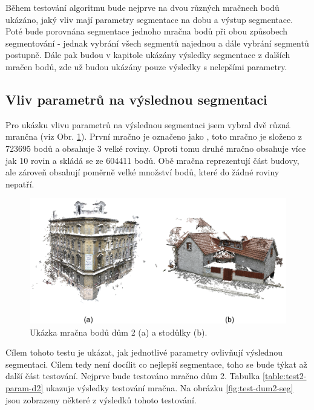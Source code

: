 \documentclass[11pt,twoside,a4paper]{book}
\begin{document}
Během testování algoritmu bude nejprve na dvou různých mračnech bodů ukázáno, jaký vliv mají parametry segmentace na dobu a výstup segmentace. Poté bude porovnána segmentace jednoho mračna bodů při obou způsobech segmentování - jednak vybrání všech segmentů najednou a dále vybrání segmentů postupně. Dále pak budou v kapitole ukázány výsledky segmentace z dalších mračen bodů, zde už budou ukázány pouze výsledky s nelepšími parametry.

\subsection{Vliv parametrů na výslednou segmentaci}

Pro ukázku vlivu parametrů na výslednou segmentaci jsem vybral dvě různá mrančna (viz Obr. \ref{fig:dum-stodulky}). První mračno je označeno jako , toto mračno je složeno z 723695 bodů a obsahuje 3 velké roviny. Oproti tomu druhé mračno  obsahuje více jak 10 rovin a skládá se ze 604411 bodů. Obě mračna reprezentují část budovy, ale zároveň obsahují poměrně velké množství bodů, které do žádné roviny nepatří.

\begin{figure}[H]
\begin{center}
\includegraphics[width=\textwidth]{figures/dum2-stodulky}
\caption{Ukázka mračna bodů dům 2 (a) a stodůlky (b).}
\label{fig:dum-stodulky}
\end{center}
\end{figure}

Cílem tohoto testu je ukázat, jak jednotlivé parametry ovlivňují výslednou segmentaci. Cílem tedy není docílit co nejlepší segmentace, toho se bude týkat až další část testování. Nejprve bude testováno mračno dům 2. Tabulka \ref{table:test2-param-d2} ukazuje výsledky testování mračna. Na obrázku \ref{fig:test-dum2-seg} jsou zobrazeny některé z výsledků tohoto testování.
\end{document}

